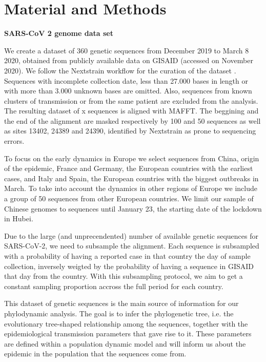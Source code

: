 \chapter{Material and Methods}

\textbf{SARS-CoV 2 genome data set}

We create a dataset of 360 genetic sequences from December 2019 to March 8 2020, obtained from publicly available data on GISAID \cite{GISAID} (accessed on November 2020). We follow the Nextstrain workflow for the curation of the dataset \cite{nextstrain}. Sequences with incomplete collection date, less than 27.000 bases in length or with more than 3.000 unknown bases are omitted. Also, sequences from known clusters of transmission or from the same patient are excluded from the analysis. The resulting dataset of x  sequences is aligned with MAFFT. The beggining and the end of the alignment are masked respectively by 100 and 50 sequences as well as sites  13402, 24389 and 24390, identified by Nextstrain as prone to sequencing errors.

To focus on the early dynamics in Europe we select sequences from China, origin of the epidemic, France and Germany, the European countries with the earliest cases, and Italy and Spain, the European countries with the biggest outbreaks in March. To take into account the dynamics in other regions of Europe we include a group of 50 sequences from other European countries. We limit our sample of Chinese genomes to sequences until January 23, the starting date of the lockdown in Hubei. 

Due to the large (and unprecendented) number of available genetic sequences for SARS-CoV-2, we need to subsample the alignment. Each sequence is subsampled with a probability of having a reported case in that country the day of sample collection, inversely weigted by the probability of having a sequence in GISAID that day from the country. With this subsampling protocol, we aim to get a constant sampling proportion accross the full period for each country. 

This dataset of genetic sequences is the main source of information for our phylodynamic analysis. The goal is to infer the phylogenetic tree, i.e. the evolutionary tree-shaped relationship among the sequences, together with the epidemiological transmission parameters that gave rise to it. These parameters are defined within a population dynamic model and will inform us about the epidemic in the population that the sequences come from.


